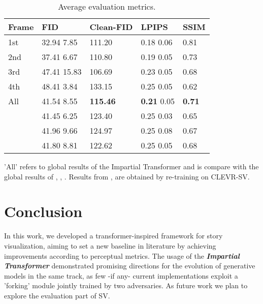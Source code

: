 \documentclass{article}
\begin{document}
\begin{table}[t!]
\caption{Average evaluation metrics. }
\label{tab:global}
\begin{tabular}{p{20pt}|p{57pt}p{42pt}p{50pt}p{20pt}}
\toprule
Frame & FID & Clean-FID & LPIPS & SSIM  \\
\midrule
1st & 32.94  7.85 & 111.20  & 0.18  0.06 & 0.81  \\
2nd & 37.41  6.67 & 110.80  & 0.19  0.05 & 0.73  \\
3rd & 47.41  15.83 & 106.69  & 0.23  0.05 & 0.68\\
4th  & 48.41  3.84 & 133.15  & 0.25  0.05 & 0.62  \\
\midrule
All & 41.54  8.55 & \textbf{115.46} & \textbf{0.21}  0.05 & \textbf{0.71}  \\
\cite{storygan} & 41.45  6.25 & 123.40 & 0.25  0.03 & 0.65\\
\cite{Maharana2021IntegratingVL} & 41.96  9.66 &  124.97 &  0.25  0.08 &  0.67 \\
\cite{Maharana2021ImprovingGA}  & 41.80  8.81 &  122.62 &  0.25  0.05 &  0.68 \\
\bottomrule
\end{tabular}
\footnotesize{'All' refers to global results of the Impartial Transformer and is compare with the global results of \cite{storygan}, \cite{Maharana2021IntegratingVL}, \cite{Maharana2021ImprovingGA}. Results from \cite{Maharana2021IntegratingVL}, \cite{Maharana2021ImprovingGA} are obtained by re-training on CLEVR-SV.}
\end{table}

\section{Conclusion}
In this work, we developed a transformer-inspired framework for story visualization, aiming to set a new baseline in literature by achieving improvements according to perceptual metrics. The usage of the \textit{\textbf{Impartial Transformer}} demonstrated promising directions for the evolution of generative models in the same track, as few -if any- current implementations exploit a 'forking' module jointly trained by two adversaries. As future work we plan to explore the evaluation part of SV.





\end{document}
